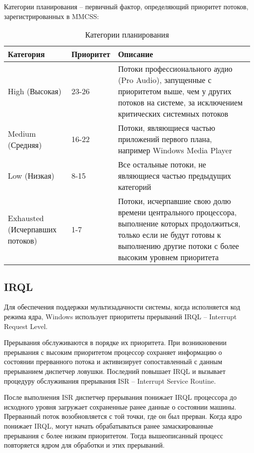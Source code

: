 Категории планирования -- первичный фактор, определяющий приоритет потоков, зарегистрированных в MMCSS:
\begin{table}[!h]
	\caption{Категории планирования}
	\begin{center}
		\begin{tabular}{|p{40mm}|p{30mm}|p{80mm}|}
			\hline
			\textbf{Категория} & \textbf{Приоритет} & \textbf{Описание} \\
			\hline
			High (Высокая) & 23-26 & Потоки профессионального аудио (Pro
			Audio), запущенные с приоритетом выше, чем у других потоков на системе, за
			исключением критических системных потоков \\
			\hline
			Medium (Средняя) & 16-22 & Потоки, являющиеся частью приложений
			первого плана, например Windows Media Player \\
			\hline
			Low (Низкая) & 8-15 & Все остальные потоки, не являющиеся частью
			предыдущих категорий \\
			\hline
			Exhausted (Исчерпавших потоков) & 1-7 & Потоки, исчерпавшие свою
			долю времени центрального процессора, выполнение которых продолжиться, только
			если не будут готовы к выполнению другие потоки с более высоким уровнем
			приоритета \\
			\hline
		\end{tabular}
	\end{center}
	\label{tab:category}
\end{table}

\clearpage
\subsection*{IRQL}

Для обеспечения поддержки мультизадачности системы, когда исполняется код режима ядра, Windows использует приоритеты прерываний IRQL --  Interrupt Request Level.

Прерывания обслуживаются в порядке их приоритета. При возникновении прерывания с высоким приоритетом процессор сохраняет информацию о состоянии прерванного потока и активизирует сопоставленный с данным прерыванием диспетчер ловушки. Последний повышает IRQL и вызывает
процедуру обслуживания прерывания ISR -- Interrupt Service Routine.

После выполнения ISR диспетчер прерывания понижает IRQL процессора до исходного уровня загружает сохраненные ранее данные о состоянии машины. Прерванный поток возобновляется с той точки, где он был прерван. Когда ядро понижает IRQL, могут начать обрабатываться ранее замаскированные прерывания с более низким приоритетом. Тогда вышеописанный процесс повторяется ядром для обработки и этих прерываний.

